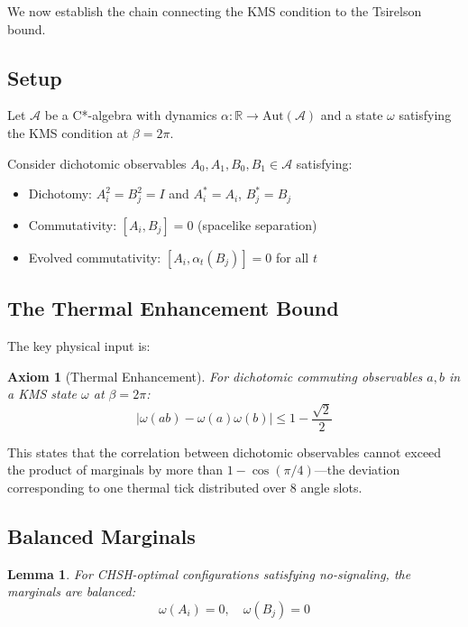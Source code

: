 \documentclass[12pt,a4paper]{article}
\newtheorem{lemma}[theorem]{Lemma}
\newtheorem{axiom}{Axiom}
\newcommand{\R}{\mathbb{R}}
\begin{document}
We now establish the chain connecting the KMS condition to the Tsirelson bound.

\subsection{Setup}

Let $\mathcal{A}$ be a C*-algebra with dynamics $\alpha : \R \to \mathrm{Aut}(\mathcal{A})$ and a state $\omega$ satisfying the KMS condition at $\beta = 2\pi$.

Consider dichotomic observables $A_0, A_1, B_0, B_1 \in \mathcal{A}$ satisfying:
\begin{itemize}
\item Dichotomy: $A_i^2 = B_j^2 = I$ and $A_i^* = A_i$, $B_j^* = B_j$
\item Commutativity: $[A_i, B_j] = 0$ (spacelike separation)
\item Evolved commutativity: $[A_i, \alpha_t(B_j)] = 0$ for all $t$
\end{itemize}

\subsection{The Thermal Enhancement Bound}

The key physical input is:

\begin{axiom}[Thermal Enhancement]
For dichotomic commuting observables $a, b$ in a KMS state $\omega$ at $\beta = 2\pi$:
\begin{equation}
|\omega(ab) - \omega(a)\omega(b)| \leq 1 - \frac{\sqrt{2}}{2}
\end{equation}
\end{axiom}

This states that the correlation between dichotomic observables cannot exceed the product of marginals by more than $1 - \cos(\pi/4)$—the deviation corresponding to one thermal tick distributed over 8 angle slots.

\subsection{Balanced Marginals}

\begin{lemma}
For CHSH-optimal configurations satisfying no-signaling, the marginals are balanced:
\begin{equation}
\omega(A_i) = 0, \quad \omega(B_j) = 0
\end{equation}
\end{lemma}
\end{document}
